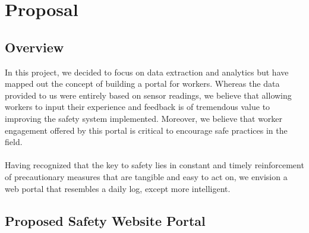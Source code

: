 \documentclass[twoside,twocolumn]{article}
\begin{document}

\section{Proposal}

\subsection{Overview}

In this project, we decided to focus on data extraction and analytics but have mapped out the concept of building a portal for workers. Whereas the data provided to us were entirely based on sensor readings, we believe that allowing workers to input their experience and feedback is of tremendous value to improving the safety system implemented. Moreover, we believe that worker engagement offered by this portal is critical to encourage safe practices in the field.\\\\ 
Having recognized that the key to safety lies in constant and timely reinforcement of precautionary measures that are tangible and easy to act on, we envision a web portal that resembles a daily log, except more intelligent.

\subsection{Proposed Safety Website Portal}
\end{document}
